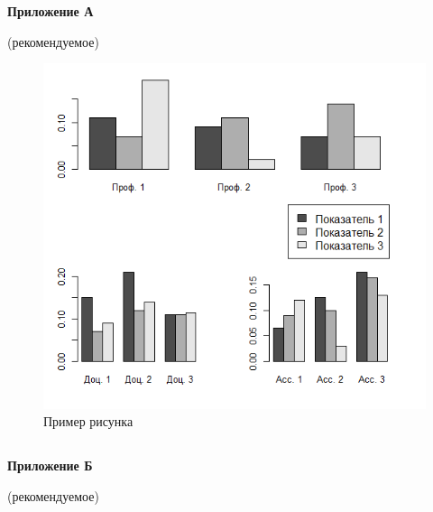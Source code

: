 \newpage
\section*{} 
\subsection*{}

\renewcommand{\thefigure}{A.\arabic{figure}}
\renewcommand{\thetable}{A.\arabic{table}}
\setcounter{table}{0}
\setcounter{figure}{0}   
\begin{center}
\textbf{Приложение А}

(рекомендуемое)

\end{center}


\begin{figure}[htbp]
	\label{primer_risunka}
	\begin{center}
		\includegraphics[scale=0.8]{Images/img1.png}
	\end{center}
	\caption{Пример рисунка}
\end{figure}

\newpage
\subsection*{}

\renewcommand{\thefigure}{Б.\arabic{figure}}
\renewcommand{\thetable}{Б.\arabic{table}}
\setcounter{table}{0}
\setcounter{figure}{0}
\begin{center}
\textbf{Приложение Б}

(рекомендуемое)

\end{center}

